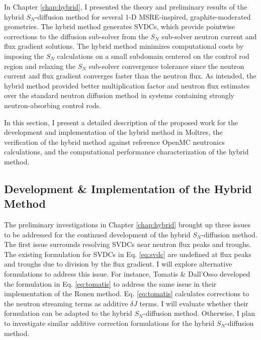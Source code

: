 In Chapter \ref{chap:hybrid}, I presented the theory and preliminary results of the hybrid
$S_N$-diffusion method for several 1-D \gls{MSRE}-inspired, graphite-moderated geometries. The
hybrid method generates \glspl{SVDC}, which provide pointwise corrections to the diffusion
sub-solver from
the $S_N$ sub-solver neutron current and flux gradient solutions. The hybrid method minimizes
computational costs by imposing the $S_N$ calculations on a small subdomain centered on the control
rod region and relaxing the $S_N$ sub-solver convergence tolerance since the neutron current and
flux gradient converges faster than the neutron flux. As intended,
the hybrid method provided better multiplication factor and neutron flux estimates over the
standard neutron diffusion method in systems containing strongly neutron-absorbing control rods.

In this section, I present a detailed description of the proposed work for the development and
implementation of the hybrid method in Moltres, the verification of the hybrid method against
reference OpenMC neutronics calculations, and the computational performance characterization of the
hybrid method.

\subsection{Development \& Implementation of the Hybrid Method}

The preliminary investigations in Chapter \ref{chap:hybrid} brought up three issues to be
addressed for the continued development of the hybrid $S_N$-diffusion method. The first issue
surrounds resolving \glspl{SVDC} near neutron flux peaks and troughs. The existing formulation
for \glspl{SVDC} in Eq. \ref{eq:svdc} are undefined at flux peaks and troughs due to division by
the flux gradient. I will explore alternative formulations to address this issue. For instance,
Tomatis \& Dall'Osso \cite{tomatis_application_2011} developed the formulation in Eq.
\ref{eq:tomatis} to address the same issue in their implementation of the Ronen method. Eq.
\ref{eq:tomatis} calculates corrections to the neutron streaming terms as additive
$\delta J$ terms. I will evaluate whether their formulation can be adapted to the hybrid
$S_N$-diffusion method. Otherwise, I plan to investigate similar additive correction formulations
for the hybrid $S_N$-diffusion method.

